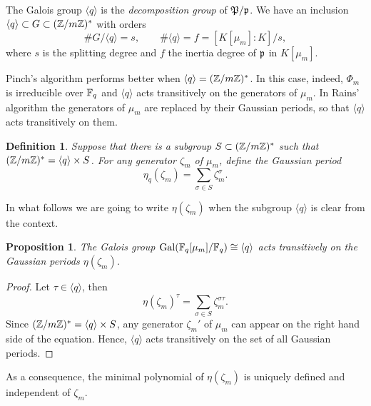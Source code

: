 \documentclass{article}
\newtheorem{Def}{Definition}
\newtheorem{Prop}{Proposition}
\begin{document}
The Galois group $\langle q\rangle$ is the \emph{decomposition group}
of $\frak{P}/\frak{p}$. We have an inclusion $\langle q\rangle\subset
G\subset(\mathbb{Z}/m\mathbb{Z})^\ast$ with orders
\begin{equation} \# G/\langle q\rangle = s,\qquad \#\langle q\rangle =
f = [K[\mu_m]:K]/s,
\end{equation}
where $s$ is the splitting degree and $f$ the inertia degree of
$\frak{p}$ in $K[\mu_m]$.

Pinch's algorithm performs better when $\langle q\rangle =
(\mathbb{Z}/m\mathbb{Z})^\ast$. In this case, indeed, $\Phi_m$ is irreducible over
$\mathbb{F}_q$ and $\langle q\rangle$ acts transitively on the generators of
$\mu_m$. In Rains' algorithm the generators of $\mu_m$ are replaced by
their Gaussian periods, so that $\langle q\rangle$ acts transitively
on them.

\begin{Def}
  \label{def:period}
  Suppose that there is a subgroup $S\subset (\mathbb{Z}/m\mathbb{Z})^\ast$ such that
  $(\mathbb{Z}/m\mathbb{Z})^\ast = \langle q\rangle\times S$. For any generator
  $\zeta_m$ of $\mu_m$, define the Gaussian period
  \begin{equation}
    \label{eq:period} \eta_q(\zeta_m) = \sum_{\sigma\in
S}\zeta_m^\sigma.
\end{equation}
\end{Def}

In what follows we are going to write $\eta(\zeta_m)$ when the
subgroup $\langle q\rangle$ is clear from the context.

\begin{Prop}
  The Galois group $\operatorname{Gal}(\mathbb{F}_q[\mu_m]/\mathbb{F}_q)\cong\langle q\rangle$ acts
  transitively on the Gaussian periods $\eta(\zeta_m)$.
\end{Prop}
\begin{proof}
  Let $\tau\in\langle q\rangle$, then
  \begin{equation} \eta(\zeta_m)^\tau = \sum_{\sigma\in S}
\zeta_m^{\sigma\tau}.
  \end{equation}
  Since $(\mathbb{Z}/m\mathbb{Z})^\ast=\langle q\rangle\times S$, any generator
  $\zeta_m'$ of $\mu_m$ can appear on the right hand side of the
  equation. Hence, $\langle q\rangle$ acts transitively on the set of
  all Gaussian periods.
\end{proof}

As a consequence, the minimal polynomial of $\eta(\zeta_m)$ is
uniquely defined and independent of $\zeta_m$.
\end{document}
